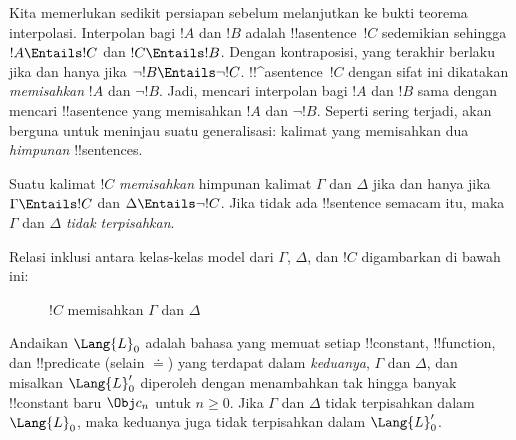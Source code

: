 \documentclass[../../../include/open-logic-section]{subfiles}
\begin{document}


Kita memerlukan sedikit persiapan sebelum melanjutkan ke bukti teorema
interpolasi. Interpolan bagi $!A$ dan $!B$ adalah !!a{sentence}~$!C$
sedemikian sehingga $!A \Entails !C$ dan $!C \Entails !B$. Dengan
kontraposisi, yang terakhir berlaku jika dan hanya jika $\lnot !B \Entails
\lnot !C$. !!^a{sentence}~$!C$ dengan sifat ini dikatakan
\emph{memisahkan} $!A$ dan $\lnot !B$. Jadi, mencari interpolan bagi $!A$
dan $!B$ sama dengan mencari !!a{sentence} yang memisahkan $!A$ dan
$\lnot !B$. Seperti sering terjadi, akan berguna untuk meninjau suatu
generalisasi: kalimat yang memisahkan dua \emph{himpunan} !!{sentence}s.

\begin{defn}
Suatu kalimat $!C$ \emph{memisahkan} himpunan kalimat $\Gamma$ dan
$\Delta$ jika dan hanya jika $\Gamma \Entails !C$ dan $\Delta \Entails
\lnot !C$. Jika tidak ada !!{sentence} semacam itu, maka $\Gamma$ dan
$\Delta$ \emph{tidak terpisahkan}.
\end{defn}

Relasi inklusi antara kelas-kelas model dari $\Gamma$, $\Delta$, dan $!C$
digambarkan di bawah ini:
\begin{figure}[h]
  \centering
  \caption{$!C$ memisahkan $\Gamma$ dan $\Delta$}
\end{figure}


\begin{lem}
Andaikan $\Lang{L}_0$ adalah bahasa yang memuat setiap !!{constant},
!!{function}, dan !!{predicate} (selain $\doteq$) yang terdapat dalam
\emph{keduanya}, $\Gamma$ dan $\Delta$, dan misalkan $\Lang{L}'_0$
diperoleh dengan menambahkan tak hingga banyak !!{constant} baru $\Obj c_n$
untuk $n \ge 0$. Jika $\Gamma$ dan $\Delta$ tidak terpisahkan dalam
$\Lang{L}_0$, maka keduanya juga tidak terpisahkan dalam $\Lang{L}'_0$.
\end{lem}
\end{document}
